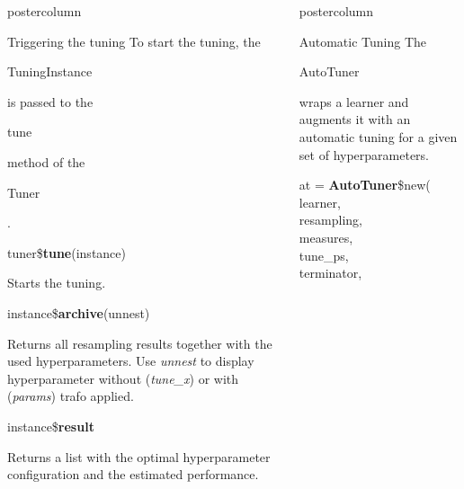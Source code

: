 \documentclass{beamer}
\newlength{\columnheight} %
\newcommand{\codeinline}[1]{\begin{codeboxinline}#1\end{codeboxinline}}
\begin{document}
\begin{frame}[fragile]{}
\begin{columns}
\begin{column}{.245\textwidth}
\begin{beamercolorbox}[center]{postercolumn}
\begin{minipage}{.98\textwidth}
{						\begin{myblock}{Triggering the tuning}
							To start the tuning, the \codeinline{TuningInstance} is passed to the \codeinline{tune} method of the \codeinline{Tuner}.
							\\
							\begin{codebox}
								tuner\$\textbf{tune}(instance)
							\end{codebox}
							Starts the tuning.
							\\
							\begin{codebox}
								instance\$\textbf{archive}(unnest)
							\end{codebox}
							Returns all resampling results together with the used hyperparameters. Use \textit{unnest} to display hyperparameter without (\textit{tune\_x}) or with (\textit{params}) trafo applied.
							\\
							\begin{codebox}
								instance\$\textbf{result}
							\end{codebox}
							Returns a list with the optimal hyperparameter configuration and the estimated performance.
						\end{myblock}
						\vfill}
				\end{minipage}
			\end{beamercolorbox}
		\end{column}
		\begin{column}{.245\textwidth}
			\begin{beamercolorbox}[center]{postercolumn}
				\begin{minipage}{.98\textwidth}
					\parbox[t][\columnheight]{\textwidth}{
						\begin{myblock}{Automatic Tuning}
							The \codeinline{AutoTuner} wraps a learner and augments it with an automatic tuning for a given set of hyperparameters.
							\\
							\begin{codeboxmultiline}[width=18cm]
								at = \textbf{AutoTuner}\$new(
								\hspace*{1ex}learner,\\
								\hspace*{1ex}resampling,\\
								\hspace*{1ex}measures,\\
								\hspace*{1ex}tune\_ps,\\
								\hspace*{1ex}terminator,\\

\end{codeboxmultiline}
\end{myblock}}
\end{minipage}
\end{beamercolorbox}
\end{column}
\end{columns}
\end{frame}
\end{document}
